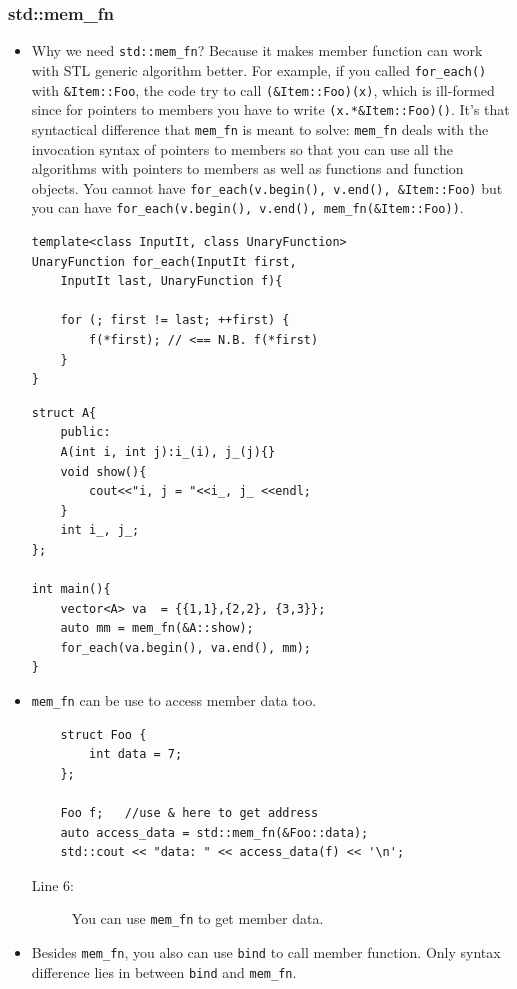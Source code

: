 \documentclass[a4paper,11pt,twoside]{book}
\begin{document}
\subsubsection{std::mem\_fn }
\begin{itemize}
	\item Why we need \texttt{std::mem\_fn}? Because it makes member function can work with STL generic algorithm better. For example, if you called \texttt{for\_each()} with \texttt{\&Item::Foo}, the code try to call \texttt{(\&Item::Foo)(x)}, which is ill-formed since for pointers to members you have to write \texttt{(x.*\&Item::Foo)()}. It's that syntactical difference that \texttt{mem\_fn} is meant to solve: \texttt{mem\_fn} deals with the invocation syntax of pointers to members so that you can use all the algorithms with pointers to members as well as functions and function objects. You cannot have \texttt{for\_each(v.begin(), v.end(), \&Item::Foo)} but you can have \texttt{for\_each(v.begin(), v.end(), mem\_fn(\&Item::Foo))}.
\begin{lstlisting}
template<class InputIt, class UnaryFunction>
UnaryFunction for_each(InputIt first, 
	InputIt last, UnaryFunction f){
	
	for (; first != last; ++first) {
		f(*first); // <== N.B. f(*first)
	}
}
\end{lstlisting}

\begin{lstlisting}
struct A{
	public:
	A(int i, int j):i_(i), j_(j){}
	void show(){
		cout<<"i, j = "<<i_, j_ <<endl;
	}
	int i_, j_;
};

int main(){
	vector<A> va  = {{1,1},{2,2}, {3,3}};
	auto mm = mem_fn(&A::show);
	for_each(va.begin(), va.end(), mm);
}
\end{lstlisting}

\item \texttt{mem\_fn} can be use to access member data too.
\begin{lstlisting}
	struct Foo {
		int data = 7;
	};
	
	Foo f;   //use & here to get address
	auto access_data = std::mem_fn(&Foo::data);
	std::cout << "data: " << access_data(f) << '\n';
\end{lstlisting}
\begin{description}
	\item[Line 6:] You can use \texttt{mem\_fn} to get member data.
\end{description}


\item Besides \texttt{mem\_fn}, you also can use \texttt{bind} to call member function. Only syntax difference lies in between \texttt{bind} and \texttt{mem\_fn}.


\end{itemize}
\end{document}
